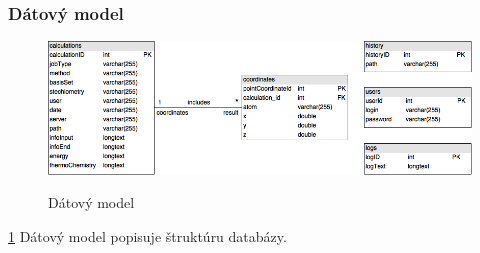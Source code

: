 \documentclass[12pt,a4paper]{article}
\begin{document}
\subsubsection{Dátový model}
\begin{figure}[H]
	\caption{Dátový model}
	\includegraphics[width=\textwidth]{datovy_model}
	\label{fig:datovy_model}
\end{figure}
\ref{fig:datovy_model}
Dátový model popisuje štruktúru databázy.
\end{document}
